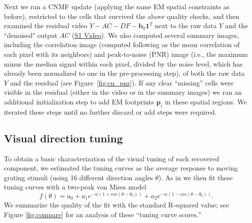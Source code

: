 \documentclass[10pt,letterpaper]{article}
\def \videoOneURL{https://www.dropbox.com/s/0ph27nsx5fxcc1b/demixing_scan_1_201_9100.avi?dl=0}
\begin{document}
{%





Next we ran a CNMF update (applying the same EM spatial constraints as before), restricted to the cells that survived the above quality checks, and then examined the residual video $Y-AC-DF-\bm{b}_0 \bm{1}^T$ next to the raw data $Y$ and the ``denoised" output $AC$ (\href{\videoOneURL}{S1 Video}).  We also computed several summary images, including the correlation image (computed following \citep{Smith2010} as the mean correlation of each pixel with its neighbors) and peak-to-noise (PNR) image (i.e., the maximum minus the median signal within each pixel, divided by the noise level, which has already been normalized to one in the pre-processing step), of both the raw data $Y$ and the residual (see Figure~\ref{fig:cn_pnr}).  If any clear ``missing'' cells were visible in the residual (either in the video or in the summary images) we ran an additional initialization step to add EM footprints $\bm{p}_i$ in these spatial regions.  We iterated these steps until no further discard or add steps were required.

\subsection{Visual direction tuning} 
\label{sec:tc_score}
To obtain a basic characterization of the visual tuning of each recovered component, we estimated the tuning curves as the average response to moving grating stimuli (using 16 different direction angles $\theta$).  As in \citep{reimer_pupil_2014} we then fit these tuning curves with a two-peak von Mises model
\begin{equation}
f(\theta) = a_0 + a_1e^{-w(1+cos(\theta-\theta_0))} + a_2e^{-w(1-cos(\theta-\theta_0))}. 
\end{equation} 
We summarize the quality of the fit with the standard R-squared value; see Figure \ref{fig:compare} for an analysis of these ``tuning curve scores."

}
\end{document}
